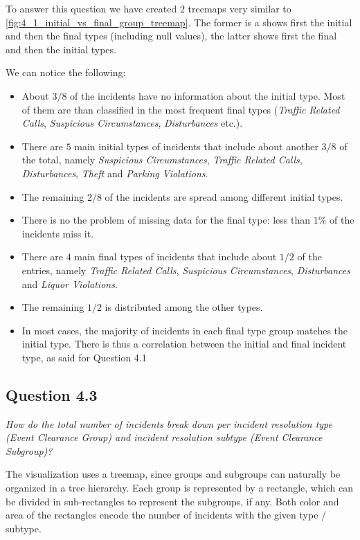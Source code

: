 To answer this question we have created $2$ treemaps very similar to \cref{fig:4_1_initial_vs_final_group_treemap}.
The former is a shows first the initial and then the final types (including null values), the latter shows first the final and then the initial types.


We can notice the following:
\begin{itemize}
	\item About $3/8$ of the incidents have no information about the initial type. Most of them are than classified in the most frequent final types (\textit{Traffic Related Calls}, \textit{Suspicious Circumstances}, \textit{Disturbances} etc.).
	\item There are $5$ main initial types of incidents that include about another $3/8$ of the total, namely \textit{Suspicious Circumstances}, \textit{Traffic Related Calls}, \textit{Disturbances}, \textit{Theft} and \textit{Parking Violations}.
	\item The remaining $2/8$ of the incidents are spread among different initial types.
	\item There is no the problem of missing data for the final type: less than $1\%$ of the incidents miss it.
	\item There are $4$ main final types of incidents that include about $1/2$ of the entries, namely \textit{Traffic Related Calls}, \textit{Suspicious Circumstances}, \textit{Disturbances} and \textit{Liquor Violations}.
	\item The remaining $1/2$ is distributed among the other types.
	\item In most cases, the majority of incidents in each final type group matches the initial type. There is thus a correlation between the initial and final incident type, as said for Question 4.1
\end{itemize}


\subsection*{Question 4.3}
\textit{How do the total number of incidents break down per incident resolution type (Event Clearance Group) and incident resolution subtype (Event Clearance Subgroup)?}

The visualization uses a treemap, since groups and subgroups can naturally be organized in a tree hierarchy.
Each group is represented by a rectangle, which can be divided in sub-rectangles to represent the subgroups, if any.
Both color and area of the rectangles encode the number of incidents with the given type / subtype.

